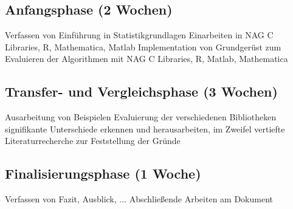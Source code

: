 \documentclass{article}
\begin{document}
\subsection{Anfangsphase (2 Wochen)}
Verfassen von Einführung in Statistikgrundlagen
Einarbeiten in NAG C Libraries, R, Mathematica, Matlab
Implementation von Grundgerüst zum Evaluieren der Algorithmen mit NAG C Libraries, R, Matlab, Mathematica

\subsection{Transfer- und Vergleichsphase (3 Wochen)}
Ausarbeitung von Beispielen
Evaluierung der verschiedenen Bibliotheken
signifikante Unterschiede erkennen und herausarbeiten, im Zweifel vertiefte Literaturrecherche zur Feststellung der Gründe

\subsection{Finalisierungsphase (1 Woche)}
Verfassen von Fazit, Ausblick, ...
Abschließende Arbeiten am Dokument

\nocite{}


\end{document}
